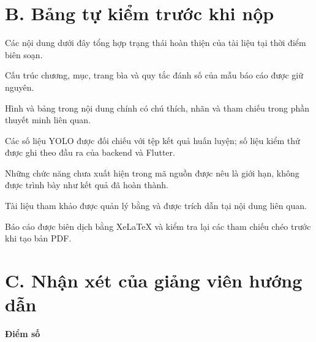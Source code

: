\section*{B. Bảng tự kiểm trước khi nộp}
{}

Các nội dung dưới đây tổng hợp trạng thái hoàn thiện của tài liệu tại thời
điểm biên soạn.

\begin{tukiem}
  \item Cấu trúc chương, mục, trang bìa và quy tắc đánh số của mẫu báo cáo
        được giữ nguyên.
  \item Hình và bảng trong nội dung chính có chú thích, nhãn và tham chiếu
        trong phần thuyết minh liên quan.
  \item Các số liệu YOLO được đối chiếu với tệp kết quả huấn luyện; số liệu
        kiểm thử được ghi theo đầu ra của backend và Flutter.
  \item Những chức năng chưa xuất hiện trong mã nguồn được nêu là giới hạn,
        không được trình bày như kết quả đã hoàn thành.
  \item Tài liệu tham khảo được quản lý bằng  và được trích
        dẫn tại nội dung liên quan.
  \item Báo cáo được biên dịch bằng XeLaTeX và kiểm tra lại các tham chiếu
        chéo trước khi tạo bản PDF.
\end{tukiem}

\section*{C. Nhận xét của giảng viên hướng dẫn}
{}

\khungnhanxet[7.5cm]

\vspace{0.8em}
\noindent\begin{minipage}[t]{0.5\textwidth}
\color{daunavy}
{\color{daumaroon}\bfseries Điểm số}

\vspace{0.7em}

\vspace{0.9em}
\end{minipage}\hfill
{}
